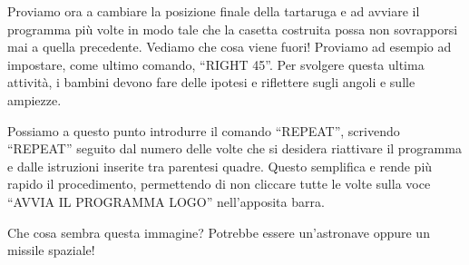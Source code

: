 Proviamo ora a cambiare la posizione finale della tartaruga e ad avviare il
programma più volte in modo tale che la casetta costruita possa non sovrapporsi
mai a quella precedente. Vediamo che cosa viene fuori!  Proviamo ad esempio ad
impostare, come ultimo comando, “RIGHT  45”.  Per svolgere questa ultima
attività, i bambini devono fare delle ipotesi e riflettere sugli angoli e sulle
ampiezze. 

Possiamo a questo punto introdurre il comando “REPEAT”, scrivendo “REPEAT”
seguito dal numero delle volte che si desidera riattivare il programma e dalle
istruzioni inserite tra parentesi quadre. Questo semplifica e rende più rapido
il procedimento, permettendo di non cliccare tutte le volte sulla voce “AVVIA
IL PROGRAMMA  LOGO” nell’apposita barra.

Che cosa sembra questa immagine? Potrebbe essere un’astronave oppure un missile
spaziale!

